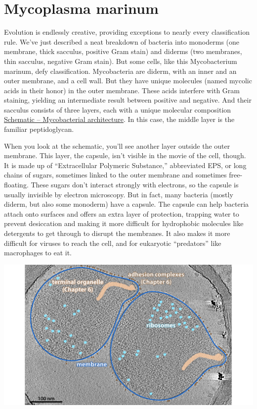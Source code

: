 \documentclass[]{tufte-book}
\begin{document}
\section{Mycoplasma marinum}\label{mycoplasma-marinum}

Evolution is endlessly creative, providing exceptions to nearly every
classification rule. We've just described a neat breakdown of bacteria
into monoderms (one membrane, thick sacculus, positive Gram stain) and
diderms (two membranes, thin sacculus, negative Gram stain). But some
cells, like this Mycobacterium marinum, defy classification.
Mycobacteria are diderm, with an inner and an outer membrane, and a cell
wall. But they have unique molecules (named mycolic acids in their
honor) in the outer membrane. These acids interfere with Gram staining,
yielding an intermediate result between positive and negative. And their
sacculus consists of three layers, each with a unique molecular
composition \protect\hyperlink{fig:2-5-1}{Schematic -- Mycobacterial
architecture}. In this case, the middle layer is the familiar
peptidoglycan.

When you look at the schematic, you'll see another layer outside the
outer membrane. This layer, the capsule, isn't visible in the movie of
the cell, though. It is made up of ``Extracellular Polymeric
Substance,'' abbreviated EPS, or long chains of sugars, sometimes linked
to the outer membrane and sometimes free-floating. These sugars don't
interact strongly with electrons, so the capsule is usually invisible by
electron microscopy. But in fact, many bacteria (mostly diderm, but also
some monoderm) have a capsule. The capsule can help bacteria attach onto
surfaces and offers an extra layer of protection, trapping water to
prevent desiccation and making it more difficult for hydrophobic
molecules like detergents to get through to disrupt the membranes. It
also makes it more difficult for viruses to reach the cell, and for
eukaryotic ``predators'' like macrophages to eat it.

\includegraphics{img/02_static/2_1_Mgenitalium}
\end{document}
